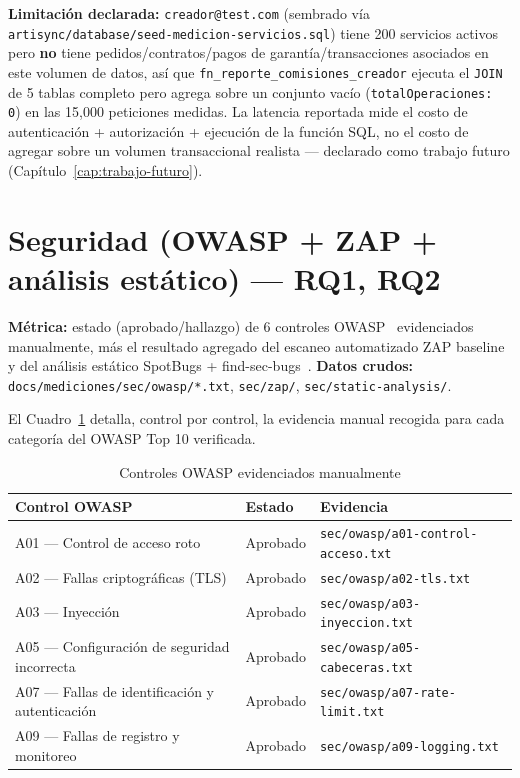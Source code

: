 \textbf{Limitación declarada:} \texttt{creador@test.com} (sembrado vía
\texttt{artisync/database/seed-medicion-servicios.sql}) tiene 200
servicios activos pero \textbf{no} tiene pedidos/contratos/pagos de
garantía/transacciones asociados en este volumen de datos, así que
\texttt{fn\_reporte\_comisiones\_creador} ejecuta el \texttt{JOIN} de 5
tablas completo pero agrega sobre un conjunto vacío
(\texttt{totalOperaciones: 0}) en las 15{,}000 peticiones medidas. La
latencia reportada mide el costo de autenticación + autorización +
ejecución de la función SQL, no el costo de agregar sobre un volumen
transaccional realista --- declarado como trabajo futuro
(Capítulo~\ref{cap:trabajo-futuro}).

\section{Seguridad (OWASP + ZAP + análisis estático) --- RQ1, RQ2}

\textbf{Métrica:} estado (aprobado/hallazgo) de 6 controles
OWASP~\cite{OWASP2021} evidenciados manualmente, más el resultado
agregado del escaneo automatizado ZAP baseline y del análisis estático
SpotBugs + find-sec-bugs~\cite{HALFOND2005,GOULD2004}. \textbf{Datos
crudos:} \texttt{docs/mediciones/sec/owasp/*.txt}, \texttt{sec/zap/},
\texttt{sec/static-analysis/}.

El Cuadro~\ref{tab:owasp} detalla, control por control, la evidencia
manual recogida para cada categoría del OWASP Top 10 verificada.

\begin{table}[H]
\centering
\caption{Controles OWASP evidenciados manualmente}
\label{tab:owasp}
\begin{tabular}{@{}p{5.4cm}p{2.0cm}p{5.6cm}@{}}
\toprule
\textbf{Control OWASP} & \textbf{Estado} & \textbf{Evidencia} \\
\midrule
A01 --- Control de acceso roto & Aprobado & \texttt{sec/owasp/a01-control-acceso.txt} \\
A02 --- Fallas criptográficas (TLS) & Aprobado & \texttt{sec/owasp/a02-tls.txt} \\
A03 --- Inyección & Aprobado & \texttt{sec/owasp/a03-inyeccion.txt} \\
A05 --- Configuración de seguridad incorrecta & Aprobado & \texttt{sec/owasp/a05-cabeceras.txt} \\
A07 --- Fallas de identificación y autenticación & Aprobado & \texttt{sec/owasp/a07-rate-limit.txt} \\
A09 --- Fallas de registro y monitoreo & Aprobado & \texttt{sec/owasp/a09-logging.txt} \\
\bottomrule
\end{tabular}
\end{table}

